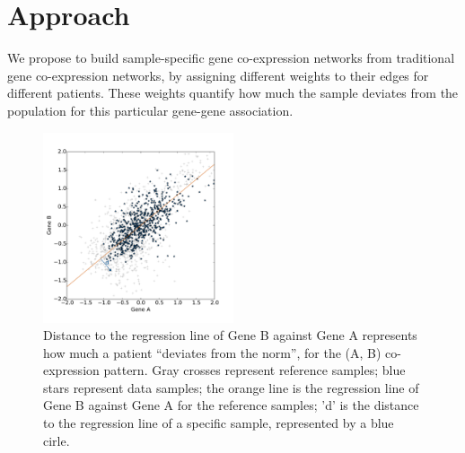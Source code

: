 \documentclass{bioinfo}
\begin{document}

\section{Approach}

We propose to build sample-specific gene co-expression networks from traditional gene co-expression networks, by assigning different weights to their edges for different patients. These weights quantify how much the sample deviates from the population for this particular gene-gene association. 

\begin{figure}[!tpb]
  \centerline{\includegraphics[width=0.5\textwidth]{regline_example.pdf}}
  \caption{Distance to the regression line of Gene B against Gene A represents how much a patient ``deviates from the norm'', for the (A, B) co-expression pattern. Gray crosses represent reference samples; blue stars represent data samples; the orange line is the regression line of Gene B against Gene A for the reference samples; 'd' is the distance to the regression line of a specific sample, represented by a blue cirle.}
  \label{fig:distance_to_regline}
\end{figure}
\end{document}

